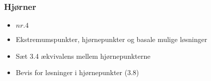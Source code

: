 \begin{frame}
\frametitle{Hjørner}
\begin{itemize}
\item \textbf{$nr. 4$}
\item Ekstremumspunkter, hjørnepunkter og basale mulige løsninger
\item Sæt 3.4 ækvivalens mellem hjørnepunkterne
\item Bevis for løsninger i hjørnepunkter (3.8)
\end{itemize}
\end{frame}